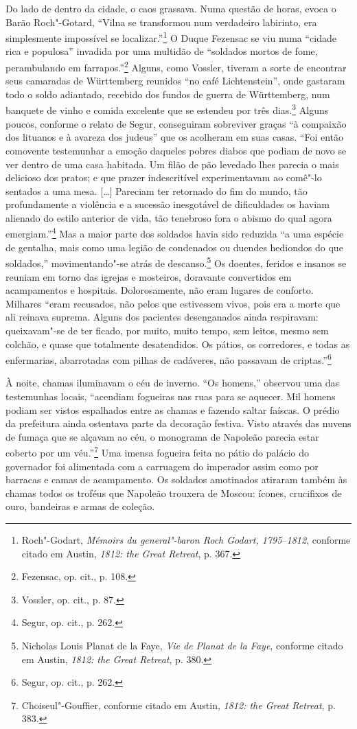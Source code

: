 Do lado de dentro da cidade, o caos grassava. Numa questão de horas,
evoca o Barão Roch"-Gotard, ``Vilna se transformou num verdadeiro
labirinto, era simplesmente impossível se localizar.''\footnote{Roch"-Godart, \textit{Mémoirs du general"-baron Roch Godart, 1795--1812}, conforme citado em Austin, \textit{1812: the Great Retreat}, p. 367.} O Duque Fezensac se viu numa ``cidade rica e populosa'' invadida por uma
multidão de ``soldados mortos de fome, perambulando em
farrapos.''\footnote{Fezensac, op. cit., p. 108.} Alguns, como Vossler,
tiveram a sorte de encontrar seus camaradas de Württemberg reunidos ``no
café Lichtenstein'', onde gastaram todo o soldo adiantado, recebido dos
fundos de guerra de Württemberg, num banquete de vinho e comida
excelente que se estendeu por três dias.\footnote{Vossler, op. cit., p. 87.} Alguns poucos, conforme o relato de Segur, conseguiram sobreviver graças ``à compaixão dos lituanos e à avareza dos judeus'' que os
acolheram em suas casas. ``Foi então comovente testemunhar a emoção
daqueles pobres diabos que podiam de novo se ver dentro de uma casa
habitada. Um filão de pão levedado lhes parecia o mais delicioso dos
pratos; e que prazer indescritível experimentavam ao comê"-lo sentados a
uma mesa. [\ldots{}] Pareciam ter retornado do fim do mundo, tão
profundamente a violência e a sucessão inesgotável de dificuldades os
haviam alienado do estilo anterior de vida, tão tenebroso fora o abismo
do qual agora emergiam.''\footnote{Segur, op. cit., p. 262.} Mas a maior
parte dos soldados havia sido reduzida ``a uma espécie de gentalha, mais
como uma legião de condenados ou duendes hediondos do que soldados,''
movimentando"-se atrás de descanso.\footnote{Nicholas Louis Planat de la Faye, \textit{Vie de Planat de la Faye}, conforme citado em Austin, \textit{1812: the Great Retreat}, p. 380.} Os doentes, feridos e insanos se reuniam em torno das igrejas e mosteiros, doravante convertidos em
acampamentos e hospitais. Dolorosamente, não eram lugares de conforto.
Milhares ``eram recusados, não pelos que estivessem vivos, pois era a
morte que ali reinava suprema. Alguns dos pacientes desenganados ainda
respiravam: queixavam"-se de ter ficado, por muito, muito tempo, sem
leitos, mesmo sem colchão, e quase que totalmente desatendidos. Os
pátios, os corredores, e todas as enfermarias, abarrotadas com pilhas de
cadáveres, não passavam de criptas.''\footnote{Segur, op. cit., p. 262.}

À noite, chamas iluminavam o céu de inverno. ``Os homens,'' observou uma
das testemunhas locais, ``acendiam fogueiras nas ruas para se aquecer.
Mil homens podiam ser vistos espalhados entre as chamas e fazendo saltar
faíscas. O prédio da prefeitura ainda ostentava parte da decoração
festiva. Visto através das nuvens de fumaça que se alçavam ao céu, o
monograma de Napoleão parecia estar coberto por um véu.''\footnote{Choiseul"-Gouffier, conforme citado em Austin, \textit{1812: the Great Retreat}, p. 383.} Uma imensa fogueira feita no pátio do palácio do governador foi
alimentada com a carruagem do imperador assim como por barracas e camas
de acampamento. Os soldados amotinados atiraram também às chamas todos
os troféus que Napoleão trouxera de Moscou: ícones, crucifixos de ouro,
bandeiras e armas de coleção.

